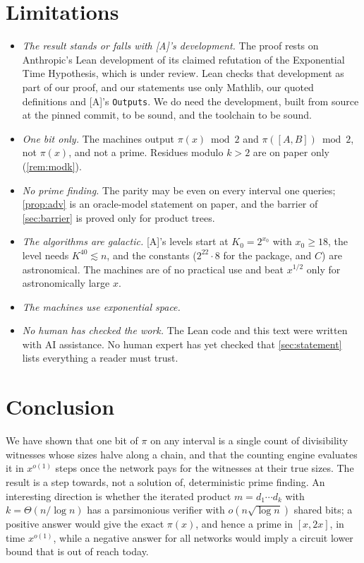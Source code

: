 \documentclass[10pt]{amsart}
\theoremstyle{plain}
\theoremstyle{definition}
\theoremstyle{remark}
\numberwithin{equation}{section}
\newcommand{\A}{\textup{[A]}}
\begin{document}
\section{Limitations}\label{sec:limitations}

\begin{itemize}
\item \emph{The result stands or falls with \A's development.} The proof rests on Anthropic's Lean
development of its claimed refutation of the Exponential Time Hypothesis, which is under review. Lean
checks that development as part of our proof, and our statements use only Mathlib, our quoted
definitions and \A's \texttt{Outputs}. We do need the development, built from source at the pinned
commit, to be sound, and the toolchain to be sound.
\item \emph{One bit only.} The machines output $\pi(x)\bmod2$ and $\pi([A,B])\bmod2$, not $\pi(x)$, and
not a prime. Residues modulo $k>2$ are on paper only (\cref{rem:modk}).
\item \emph{No prime finding.} The parity may be even on every interval one queries; \cref{prop:adv} is
an oracle-model statement on paper, and the barrier of \cref{sec:barrier} is proved only for product
trees.
\item \emph{The algorithms are galactic.} \A's levels start at $K_0=2^{x_0}$ with $x_0\ge18$, the level
needs $K^{40}\lesssim n$, and the constants ($2^{22}\cdot8$ for the package, and $C$) are astronomical. The
machines are of no practical use and beat $x^{1/2}$ only for astronomically large $x$.
\item \emph{The machines use exponential space.}
\item \emph{No human has checked the work.} The Lean code and this text were written with AI assistance.
No human expert has yet checked that \cref{sec:statement} lists everything a reader must trust.
\end{itemize}

\section{Conclusion}\label{sec:conclusion}
We have shown that one bit of $\pi$ on any interval is a single count of divisibility witnesses whose
sizes halve along a chain, and that the counting engine evaluates it in $x^{o(1)}$ steps once the network
pays for the witnesses at their true sizes. The result is a step towards, not a solution of, deterministic
prime finding. An interesting direction is whether the iterated product $m=d_1\cdots d_k$ with
$k=\Theta(n/\log n)$ has a parsimonious verifier with $o(n\sqrt{\log n})$ shared bits; a positive answer
would give the exact $\pi(x)$, and hence a prime in $[x,2x]$, in time $x^{o(1)}$, while a negative answer for
all networks would imply a circuit lower bound that is out of reach today.
\end{document}
